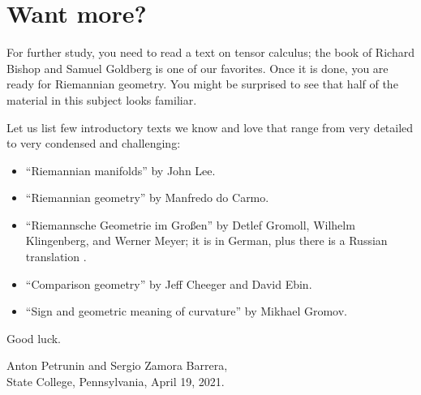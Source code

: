 \chapter*{Want more?}

For further study, you need to read a text on tensor calculus;
the book of Richard Bishop and Samuel Goldberg \cite{bishop-goldberg} is one of our favorites.
Once it is done, you are ready for Riemannian geometry.
You might be surprised to see that half of the material in this subject looks familiar.

Let us list few introductory texts we know and love that range from very detailed to very condensed and challenging:
\begin{itemize}
\item ``Riemannian manifolds''  \cite{lee2006riemannian} by John Lee.
\item ``Riemannian geometry'' \cite{carmo1992riemannian} by Manfredo do Carmo.
\item ``Riemannsche Geometrie im Großen'' \cite{gromoll-klingenberg-meyer} by 
Detlef Gromoll,
Wilhelm Klingenberg, 
and  Werner Meyer; it is in German, plus there is a Russian translation \cite{gromoll-klingenberg-meyer-ru}.
\item ``Comparison geometry'' \cite{cheeger-ebin} by Jeff Cheeger and David Ebin. 
\item ``Sign and geometric meaning of curvature'' \cite{gromov-1991} by Mikhael Gromov.
\end{itemize}
Good luck.

\begin{flushright}
Anton Petrunin and Sergio Zamora Barrera,\\
State College, Pennsylvania, April 19, 2021.
\end{flushright}
